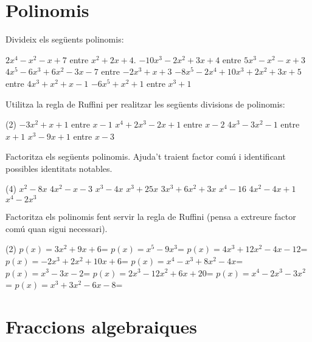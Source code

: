 \documentclass[11pt, a4paper, pdf]{article}
\begin{document}
\section{Polinomis}
	\begin{mylist}
 
	
	\item  Divideix els següents polinomis:   
	\begin{tasks}
		\task $2x^{4} -x^{2} -x+7$ entre $x^{2} +2x+4$.    
		\task $-10x^{3} -2x^{2} +3x+4$ entre $5x^{3} -x^{2} -x+3$
		\task $4x^{5} -6x^{3} +6x^{2} -3x-7$ entre $-2x^{3} +x+3$   
		\task $-8x^{5} -2x^{4} +10x^{3} +2x^{2} +3x+5$ entre $4x^{3} +x^{2} +x-1$ 
		\task $-6x^{5} +x^{2} +1$ entre $x^{3} +1$ 
	\end{tasks}
	
	
	\item  Utilitza la regla de {Ruffini} per realitzar les següents divisions de polinomis:
	\begin{tasks}(2)
		\task $-3x^{2} +x+1$ entre $x-1$  
		\task $x^{4} +2x^{3} -2x+1$ entre $x-2$
		\task $4x^{3} -3x^{2} -1$ entre $x+1$   
		\task $x^{3} -9x+1$ entre $x-3$ 
	\end{tasks}

\item  Factoritza els següents polinomis. Ajuda't traient factor comú i identificant possibles identitats notables.
\begin{tasks}(4)
	\task $x^{2} -8x$  	
	\task $4x^{2} -x-3$  
	\task $x^{3} -4x$  	
	\task $x^{3} +25x$
	\task $3x^3+6x^2+3x$
	\task $x^4 - 16$
	\task $4x^2 - 4x +1$
	\task $x^4 - 2x^3$
\end{tasks}
 
\item  Factoritza els polinomis fent servir la regla de Ruffini (pensa a extreure factor com\'{u}       quan sigui necessari).
\begin{tasks}(2)
	\task  $p(x)=3x^{2} +9x+6$=                  
	\task  $p(x)=x^{5} -9x^{3} $=
	\task  $p(x)=4x^{3} +12x^{2} -4x-12$=     
	\task  $p(x)=-2x^{3} +2x^{2} +10x+6$=                        
	\task  $p(x)=x^{4} -x^{3} +8x^{2} -4x$=               
	\task  $p(x)=x^{3} -3x-2$=
	\task  $p(x)=2x^{3} -12x^{2} +6x+20$=       
	\task  $p(x)=x^{4} -2x^{3} -3x^{2} $=      
	\task  $p(x)=x^{3} +3x^{2} -6x-8$=
\end{tasks}   
 
\end{mylist}


\section{Fraccions algebraiques}
\end{document}
